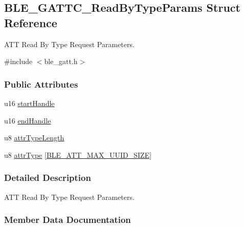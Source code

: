 \hypertarget{struct_b_l_e___g_a_t_t_c___read_by_type_params}{}\subsection{B\+L\+E\+\_\+\+G\+A\+T\+T\+C\+\_\+\+Read\+By\+Type\+Params Struct Reference}
\label{struct_b_l_e___g_a_t_t_c___read_by_type_params}


A\+TT Read By Type Request Parameters.  




{\ttfamily \#include $<$ble\+\_\+gatt.\+h$>$}

\subsubsection*{Public Attributes}
\begin{DoxyCompactItemize}
\item 
u16 \hyperlink{struct_b_l_e___g_a_t_t_c___read_by_type_params_a418d83136345db4edd07f0218a5ffcb8}{start\+Handle}
\item 
u16 \hyperlink{struct_b_l_e___g_a_t_t_c___read_by_type_params_afbafc4f76dcccd49f06e4d4388bde626}{end\+Handle}
\item 
u8 \hyperlink{struct_b_l_e___g_a_t_t_c___read_by_type_params_ad4136e9296e118349b4a6f760ebba66f}{attr\+Type\+Length}
\item 
u8 \hyperlink{struct_b_l_e___g_a_t_t_c___read_by_type_params_a7cb99d2fde936bf0c893de6a19ba75c1}{attr\+Type} \mbox{[}\hyperlink{group___b_l_e___g_a_t_t_gaf7a0af4a975d6ef5bcb00e86d9098390}{B\+L\+E\+\_\+\+A\+T\+T\+\_\+\+M\+A\+X\+\_\+\+U\+U\+I\+D\+\_\+\+S\+I\+ZE}\mbox{]}
\end{DoxyCompactItemize}


\subsubsection{Detailed Description}
A\+TT Read By Type Request Parameters. 

\subsubsection{Member Data Documentation}
